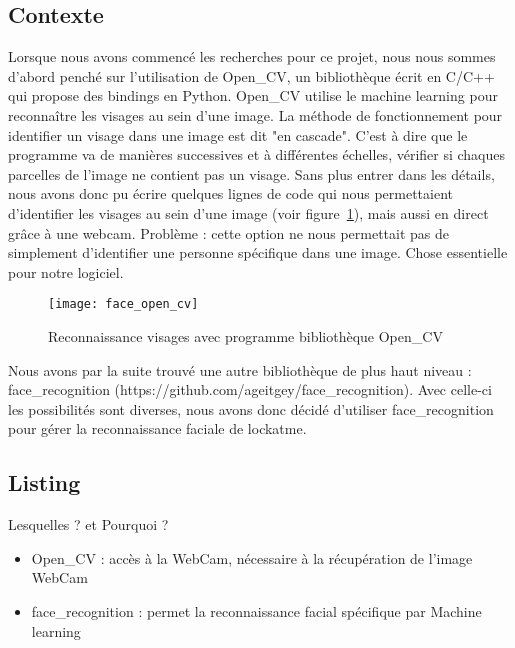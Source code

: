 \subsection{Contexte}
Lorsque nous avons commencé les recherches pour ce projet, nous nous sommes
d'abord penché sur l'utilisation de Open\_CV, un bibliothèque écrit en C/C++ qui
propose des bindings en Python. Open\_CV utilise le machine learning pour
reconnaître les visages au sein d'une image. La méthode de fonctionnement pour
identifier un visage dans une image est dit "en cascade". C'est à dire que le
programme va de manières successives et à différentes échelles, vérifier si
chaques parcelles de l'image ne contient pas un visage. Sans plus entrer dans
les détails, nous avons donc pu écrire quelques lignes de code qui nous
permettaient d'identifier les visages au sein d'une image (voir
figure~\ref{fig:face}), mais aussi en direct grâce à une webcam. Problème :
cette option ne nous permettait pas de simplement d'identifier une personne
spécifique dans une image. Chose essentielle pour notre logiciel.
\\

\begin{figure}[h]
  \texttt{[image: face\_open\_cv]}
  \caption{Reconnaissance visages avec programme bibliothèque Open\_CV}
  \label{fig:face}
\end{figure}

\newpage

Nous avons par la suite trouvé une autre bibliothèque de plus haut niveau :
face\_recognition (https://github.com/ageitgey/face\_recognition). Avec celle-ci
les possibilités sont diverses, nous avons donc décidé d'utiliser face\_recognition
pour gérer la reconnaissance faciale de lockatme.

\subsection{Listing}
Lesquelles ? et Pourquoi ?
\\
  \begin{itemize}
    \item{Open\_CV : accès à la WebCam, nécessaire à la récupération de l'image
    WebCam}
    \item{face\_recognition : permet la reconnaissance facial spécifique par
    Machine learning}
  \end{itemize}

